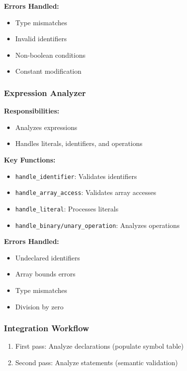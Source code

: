 \documentclass[12pt,a4paper]{article}
\begin{document}
\textbf{Errors Handled:}
\begin{itemize}
	\item Type mismatches
	\item Invalid identifiers
	\item Non-boolean conditions
	\item Constant modification
\end{itemize}

\subsubsection{Expression Analyzer}

\textbf{Responsibilities:}
\begin{itemize}
	\item Analyzes expressions
	\item Handles literals, identifiers, and operations
\end{itemize}

\textbf{Key Functions:}
\begin{itemize}
	\item \texttt{handle\_identifier}: Validates identifiers
	\item \texttt{handle\_array\_access}: Validates array accesses
	\item \texttt{handle\_literal}: Processes literals
	\item \texttt{handle\_binary/unary\_operation}: Analyzes operations
\end{itemize}

\textbf{Errors Handled:}
\begin{itemize}
	\item Undeclared identifiers
	\item Array bounds errors
	\item Type mismatches
	\item Division by zero
\end{itemize}

\subsubsection{Integration Workflow}

\begin{enumerate}
	\item First pass: Analyze declarations (populate symbol table)
	\item Second pass: Analyze statements (semantic validation)
\end{enumerate}
\end{document}
